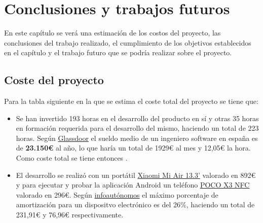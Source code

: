 \chapter{Conclusiones y trabajos futuros}

En este capítulo se verá una estimación de los costos del proyecto, las conclusiones del trabajo realizado, el cumplimiento de los objetivos establecidos en el capítulo y el trabajo futuro que se podría realizar sobre el proyecto.

\section{Coste del proyecto}

Para la tabla siguiente en la que se estima el coste total del proyecto se tiene que:

\begin{itemize}
    \item Se han invertido 193 horas en el desarrollo del producto en sí y otras 35 horas en formación requerida para el desarrollo del mismo, haciendo un total de 223 horas. Según \href{https://www.glassdoor.es/Sueldos/ingeniero-de-software-junior-sueldo-SRCH_KO0,28.htm}{Glassdoor} el sueldo medio de un ingeniero software en españa es de \textbf{23.150€} al año, lo que haría un total de 1929€ al mes y 12,05€ la hora. Como coste total se tiene entonces .
    \item El desarrollo se realizó con un portátil \href{https://www.pccomponentes.com/xiaomi-mi-air-133}{Xiaomi Mi Air 13.3'} valorado en 892€ y para ejecutar y probar la aplicación Android un teléfono  \href{https://www.pccomponentes.com/xiaomi-pocophone-x3-pro-6-128gb-negro-fantasma-libre?campaigntype=eshopping&campaignchannel=shopping&gclid=CjwKCAjwwb6lBhBJEiwAbuVUSmfq8uld2evyq45XvC7d-Z7_pEOL-tJDGXPMoYw4ZQP-RPIwTP_svBoCmcAQAvD_BwE}{POCO X3 NFC} valorado en 296€. Según \href{https://www.infoautonomos.com/contabilidad/tablas-de-amortizacion-para-los-bienes-de-una-empresa/}{infoautónomos} el máximo porcentaje de amortización para un dispositvo electrónico es del 26\%, haciendo un total de 231,91€ y 76,96€ respectivamente.
\end{itemize}

